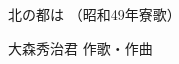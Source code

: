 \documentclass[10pt,b5j]{tarticle} %
\begin{document}
\begin{minipage}[c]{0.7\hsize} %
    \begin{center}
        {\LARGE
            北の都は %
        }
        {\small 
            （昭和49年寮歌） %
        }
    \end{center}
\end{minipage}
\begin{minipage}[c]{0.3\hsize} %
    \begin{flushright} %
        大森秀治君 作歌・作曲 %
    \end{flushright}
\end{minipage}
\end{document}
